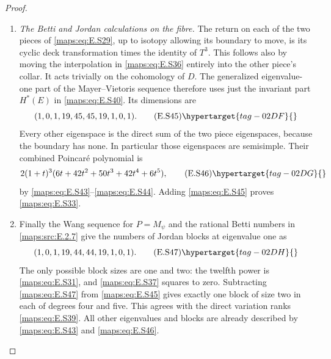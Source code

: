 \begin{proof}
\begin{enumerate}[label={$\langle1\rangle$\arabic*.},leftmargin=*]
\item \emph{The Betti and Jordan calculations on the fibre.}
The return on each of the two pieces of \eqref{maps:eq:E.S29}, up to
isotopy allowing its boundary to move, is its cyclic deck
transformation times the identity of $T^3$. This follows
also by moving the interpolation in \eqref{maps:eq:E.S36} entirely into
the other piece's collar. It acts trivially on the
cohomology of $D$. The generalized eigenvalue-one part of
the Mayer--Vietoris sequence therefore uses just the
invariant part $H^*(E)$ in \eqref{maps:eq:E.S40}. Its dimensions are
\[
       (1,0,1,19,45,45,19,1,0,1).
 \tag{E.S45}\hypertarget{tag-02DF}{}\label{maps:eq:E.S45}
\]
Every other eigenspace is the direct sum of the two piece
eigenspaces, because the boundary has none. In particular
those eigenspaces are semisimple. Their combined Poincar\'e
polynomial is
\[
     2(1+t)^3(6t+42t^2+50t^3+42t^4+6t^5),
 \tag{E.S46}\hypertarget{tag-02DG}{}\label{maps:eq:E.S46}
\]
by \eqref{maps:eq:E.S43}--\eqref{maps:eq:E.S44}. Adding \eqref{maps:eq:E.S45} proves \eqref{maps:eq:E.S33}.

\item Finally the Wang sequence for $P=M_\psi$ and the rational
Betti numbers in \ref{maps:src:E.2.7} give the numbers of Jordan blocks
at eigenvalue one as
\[
          (1,0,1,19,44,44,19,1,0,1).
 \tag{E.S47}\hypertarget{tag-02DH}{}\label{maps:eq:E.S47}
\]
The only possible block sizes are one and two: the
twelfth power is \eqref{maps:eq:E.S31}, and \eqref{maps:eq:E.S37} squares to zero.
Subtracting \eqref{maps:eq:E.S47} from \eqref{maps:eq:E.S45} gives exactly one block
of size two in each of degrees four and five. This agrees with the direct variation ranks \eqref{maps:eq:E.S39}.
All other eigenvalues and blocks are already described
by \eqref{maps:eq:E.S43} and \eqref{maps:eq:E.S46}. \end{enumerate}
\end{proof}

